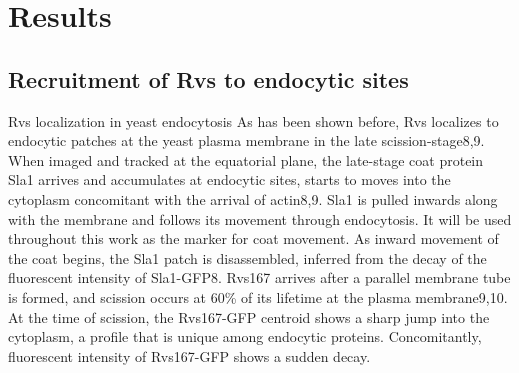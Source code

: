 \chapter{Results}    \label{results}
\section{Recruitment of Rvs to endocytic sites}

Rvs localization in yeast endocytosis
As has been shown before, Rvs localizes to endocytic patches at the yeast plasma membrane in the late scission-stage8,9. When imaged and tracked at the equatorial plane, the late-stage coat protein Sla1 arrives and accumulates at endocytic sites, starts to moves into the cytoplasm concomitant with the arrival of actin8,9. Sla1 is pulled inwards along with the membrane and follows its movement through endocytosis. It will be used throughout this work as the marker for coat movement. As inward movement of the coat begins, the Sla1 patch is disassembled, inferred from the decay of the fluorescent intensity of Sla1-GFP8. Rvs167 arrives after a parallel membrane tube is formed, and scission occurs at 60\% of its lifetime at the plasma membrane9,10. At the time of scission, the Rvs167-GFP centroid shows a sharp jump into the cytoplasm, a profile that is unique among endocytic proteins. Concomitantly, fluorescent intensity of Rvs167-GFP shows a sudden decay.

